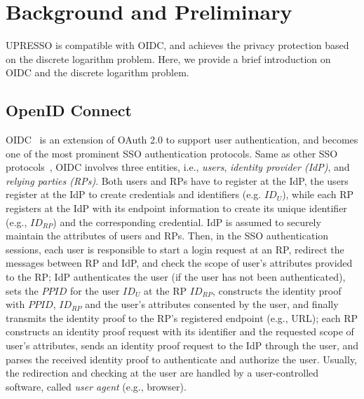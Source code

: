 \section{Background and Preliminary}
\label{sec:background}
UPRESSO is compatible with OIDC, and achieves the privacy protection based on the discrete logarithm problem.
Here, we provide a brief introduction on OIDC and the discrete logarithm problem.

\subsection{OpenID Connect}
\label{subsec:OIDC}
OIDC~\cite{OpenIDConnect} is an extension of OAuth 2.0 to support user authentication,
 and becomes one of the most prominent SSO authentication protocols.
Same as other SSO protocols~\cite{SAMLIdentifier}, OIDC involves three entities, i.e., {\em users}, {\em identity provider (IdP)}, and {\em relying parties (RPs)}.
Both users and RPs have to register at the IdP,    
the users register at the IdP to create credentials and identifiers (e.g. $ID_U$), %
while each RP registers at the IdP with its endpoint information to create its unique identifier (e.g., $ID_{RP}$) and the corresponding credential.
IdP is assumed to securely maintain the attributes  of users and RPs.   
Then, in the SSO authentication sessions, 
 each user is responsible to start a login request at an RP, redirect the messages between RP and IdP, and check the scope of user's attributes provided to the RP;
 IdP authenticates the user (if the user has not been authenticated), sets the $PPID$ for the user $ID_U$ at the RP $ID_{RP}$,
 constructs the identity proof with  $PPID$, $ID_{RP}$ and the user's attributes consented by the user, and finally transmits the identity proof to the RP's registered endpoint (e.g., URL);
 each RP constructs an identity proof request with its identifier and the requested scope of  user's attributes, sends an identity proof request to the IdP through the user, and parses the received identity proof to authenticate and authorize the user.
Usually, the redirection and checking at the user are handled by a user-controlled software, called {\em user agent} (e.g., browser).



